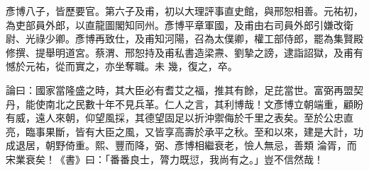 \begin{pinyinscope}
 彥博八子，皆歷要官。第六子及甫，初以大理評事直史館，與邢恕相善。元祐初，為吏部員外郎，以直龍圖閣知同州。彥博平章軍國，及甫由右司員外郎引嫌改衛尉、光祿少卿。彥博再致仕，及甫知河陽，召為太僕卿，權工部侍郎，罷為集賢殿修撰、提舉明道宮。蔡渭、邢恕持及甫私書造梁燾、劉摯之謗，逮詣詔獄，及甫有憾於元祐，從而實之，亦坐奪職。未
 幾，復之，卒。



 論曰：國家當隆盛之時，其大臣必有耆艾之福，推其有餘，足芘當世。富弼再盟契丹，能使南北之民數十年不見兵革。仁人之言，其利博哉！文彥博立朝端重，顧盼有威，遠人來朝，仰望風採，其德望固足以折沖禦侮於千里之表矣。至於公忠直亮，臨事果斷，皆有大臣之風，又皆享高壽於承平之秋。至和以來，建是大計，功成退居，朝野倚重。熙、豐而降，弼、彥博相繼衰老，憸人無忌，善類
 淪胥，而宋業衰矣！《書》曰：「番番良士，膂力既愆，我尚有之。」豈不信然哉！



\end{pinyinscope}